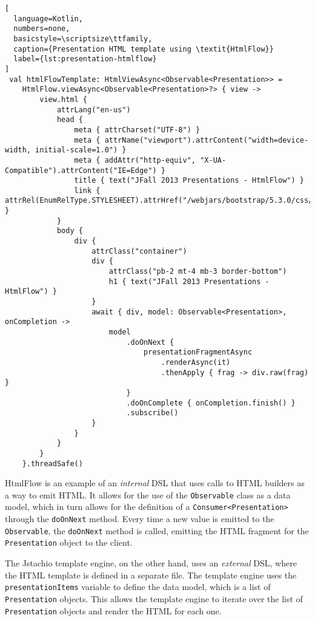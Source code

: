 \begin{lstlisting}[
  language=Kotlin,
  numbers=none,
  basicstyle=\scriptsize\ttfamily,
  caption={Presentation HTML template using \textit{HtmlFlow}}
  label={lst:presentation-htmlflow}
]
 val htmlFlowTemplate: HtmlViewAsync<Observable<Presentation>> =
    HtmlFlow.viewAsync<Observable<Presentation>?> { view ->
        view.html {
            attrLang("en-us")
            head {
                meta { attrCharset("UTF-8") }
                meta { attrName("viewport").attrContent("width=device-width, initial-scale=1.0") }
                meta { addAttr("http-equiv", "X-UA-Compatible").attrContent("IE=Edge") }
                title { text("JFall 2013 Presentations - HtmlFlow") }
                link { attrRel(EnumRelType.STYLESHEET).attrHref("/webjars/bootstrap/5.3.0/css/bootstrap.min.css") }
            }
            body {
                div {
                    attrClass("container")
                    div {
                        attrClass("pb-2 mt-4 mb-3 border-bottom")
                        h1 { text("JFall 2013 Presentations - HtmlFlow") }
                    }
                    await { div, model: Observable<Presentation>, onCompletion ->
                        model
                            .doOnNext { 
                                presentationFragmentAsync
                                    .renderAsync(it)
                                    .thenApply { frag -> div.raw(frag) }
                            }
                            .doOnComplete { onCompletion.finish() }
                            .subscribe()
                    }
                }
            }
        }
    }.threadSafe()
\end{lstlisting}
\lstset{style=listingstyle}

HtmlFlow is an example of an \textit{internal} DSL that uses calls to HTML
builders as a way to emit HTML\@. It allows for the use of the
\texttt{Observable} class as a data model, which in turn allows for the definition of a
\texttt{Consumer<Presentation>} through the \texttt{doOnNext} method. Every
time a new value is emitted to the \texttt{Observable}, the \texttt{doOnNext}
method is called, emitting the HTML fragment for the \texttt{Presentation}
object to the client.

The Jstachio template engine, on the other hand, uses an \textit{external} DSL,
where the HTML template is defined in a separate file. The template engine uses
the \texttt{presentationItems} variable to define the data model, which is a
list of \texttt{Presentation} objects. This allows the template engine to
iterate over the list of \texttt{Presentation} objects and render the HTML for
each one.

